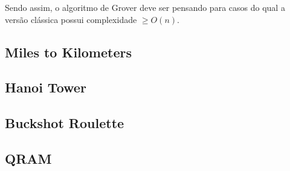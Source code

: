 \documentclass{article}
\begin{document}
Sendo assim, o algoritmo de Grover deve ser pensando para casos do qual a versão clássica possui complexidade $\ge O(n)$.


\subsection{Miles to Kilometers}
\subsection{Hanoi Tower}
\subsection{Buckshot Roulette}
\subsection{QRAM}

\begin{center}
\end{center}

\nocite{SOARE2009368}
\nocite{odonnell_2015_lecture}
\nocite{bacon_2006_cse}
\nocite{lipics_stacs}
\nocite{odonnell_2015_lecture_2}
\nocite{brodkorb_2019_the}
\nocite{amreen_oracle}
\nocite{kalyanasyndaram_2021_mod04lec23}
\nocite{davis_2006_turing}
\nocite{viswanathan_2013_reductions}
\nocite{Fan_2007}
\nocite{cryptoeprint:2020/1270}
\nocite{buhrman1998quantum}
\nocite{sanchezrivero2023initial}
\nocite{gilliam2020canonical}
\nocite{Kashefi_2002}
\nocite{e21080800}
\nocite{Zeng_2014}
\nocite{atici2004comparative}
\nocite{sundarappan_2022_how}
\nocite{dai_view}
\nocite{sep-game-theory}
\nocite{Giovannetti_2008}
\nocite{jaques2023qram}
\nocite{PythonEWL2022}
\nocite{frackiewicz2011application}
\nocite{Eisert_1999}
\nocite{usman_2019_kilometres}
\nocite{ldiaandr_2021_tower}
\nocite{diptokarmakar47_2019_how}
\nocite{a2020_towers}
\nocite{geeksforgeeks_2014_program}
\nocite{khan_2021_quantum}
\nocite{legn_2022_dilemma}
\nocite{siegelwax_2022_quantum}
\nocite{landi_density}
\nocite{bacon_2006_cse}
\nocite{vijayakrishnan_2019_role}
\nocite{python_scientific}
\nocite{scipyoptimizeminimize_scalar}
\nocite{davis_optimization}
\nocite{scipyoptimizeminimize}





\end{document}
